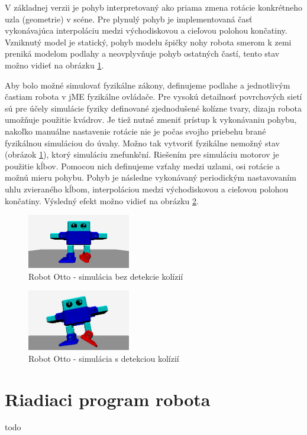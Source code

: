 V základnej verzii je pohyb interpretovaný ako priama zmena rotácie konkrétneho uzla (geometrie) v scéne. Pre plynulý pohyb je implementovaná časť vykonávajúca interpoláciu medzi východiskovou a cieľovou polohou končatiny. Vzniknutý model je statický, pohyb modelu špičky nohy robota smerom k zemi preniká modelom podlahy a neovplyvňuje pohyb ostatných častí, tento stav možno vidieť na obrázku \ref{obr:otto-without-collision}.

Aby bolo možné simulovať fyzikálne zákony, definujeme podlahe a jednotlivým častiam robota v jME fyzikálne ovládače. Pre vysokú detailnosť povrchových sietí sú pre účely simulácie fyziky definované zjednodušené kolízne tvary, dizajn robota umožňuje použitie kvádrov. Je tiež nutné zmeniť prístup k vykonávaniu pohybu, nakoľko manuálne nastavenie rotácie nie je počas svojho priebehu brané fyzikálnou simuláciou do úvahy. Možno tak vytvoriť fyzikálne nemožný stav (obrázok \ref{obr:otto-without-collision}), ktorý simuláciu znefunkční. Riešením pre simuláciu motorov je použitie kĺbov. Pomocou nich definujeme vzťahy medzi uzlami, osi rotácie a možnú mieru pohybu. Pohyb je následne vykonávaný periodickým nastavovaním uhlu zvieraného kĺbom, interpoláciou medzi východiskovou a cieľovou polohou končatiny. Výsledný efekt možno vidieť na obrázku \ref{obr:otto-with-collision}.

\begin{figure}
\centerline{\includegraphics[width=0.4\textwidth]{images/otto-without-collision}}
\caption[Robot Otto - simulácia bez detekcie kolízií]{Robot Otto - simulácia bez detekcie kolízií}
\label{obr:otto-without-collision}
\end{figure}

\begin{figure}
\centerline{\includegraphics[width=0.4\textwidth]{images/otto-with-collision}}
\caption[Robot Otto - simulácia s detekciou kolízií]{Robot Otto - simulácia s detekciou kolízií}
\label{obr:otto-with-collision}
\end{figure}


\section{Riadiaci program robota}
todo












